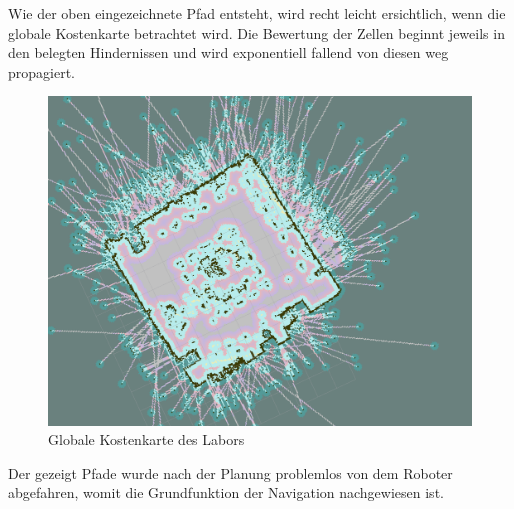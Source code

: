 \newpage
Wie der oben eingezeichnete Pfad entsteht, wird recht leicht ersichtlich, wenn die globale Kostenkarte betrachtet wird. Die Bewertung der Zellen beginnt jeweils in den belegten Hindernissen und wird exponentiell fallend von diesen weg propagiert.
\begin{figure}[!ht]
\centering
\includegraphics[scale=0.5, trim={4cm 2cm 9cm 3cm},clip]{img/Experiment1_Global_Costmap.png}
\caption{Globale Kostenkarte des Labors}
\end{figure}
Der gezeigt Pfade wurde nach der Planung problemlos von dem Roboter abgefahren, womit die Grundfunktion der Navigation nachgewiesen ist.